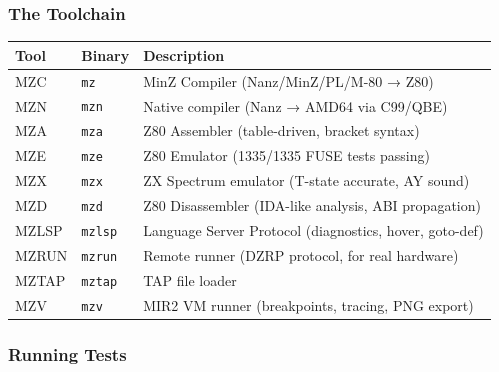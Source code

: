 \documentclass[
  11pt,
]{article}
\begin{document}
\subsubsection{The Toolchain}\label{the-toolchain}

\begin{longtable}[]{@{}
  >{\raggedright\arraybackslash}p{}
  >{\raggedright\arraybackslash}p{}
  >{\raggedright\arraybackslash}p{}@{}}
\toprule\noalign{}
\begin{minipage}[b]{\linewidth}\raggedright
Tool
\end{minipage} & \begin{minipage}[b]{\linewidth}\raggedright
Binary
\end{minipage} & \begin{minipage}[b]{\linewidth}\raggedright
Description
\end{minipage} \\
\midrule\noalign{}
\endhead
\bottomrule\noalign{}
\endlastfoot
MZC & \texttt{mz} & MinZ Compiler (Nanz/MinZ/PL/M-80 → Z80) \\
MZN & \texttt{mzn} & Native compiler (Nanz → AMD64 via C99/QBE) \\
MZA & \texttt{mza} & Z80 Assembler (table-driven, bracket syntax) \\
MZE & \texttt{mze} & Z80 Emulator (1335/1335 FUSE tests passing) \\
MZX & \texttt{mzx} & ZX Spectrum emulator (T-state accurate, AY
sound) \\
MZD & \texttt{mzd} & Z80 Disassembler (IDA-like analysis, ABI
propagation) \\
MZLSP & \texttt{mzlsp} & Language Server Protocol (diagnostics, hover,
goto-def) \\
MZRUN & \texttt{mzrun} & Remote runner (DZRP protocol, for real
hardware) \\
MZTAP & \texttt{mztap} & TAP file loader \\
MZV & \texttt{mzv} & MIR2 VM runner (breakpoints, tracing, PNG
export) \\
\end{longtable}

\subsubsection{Running Tests}\label{running-tests}
\end{document}
